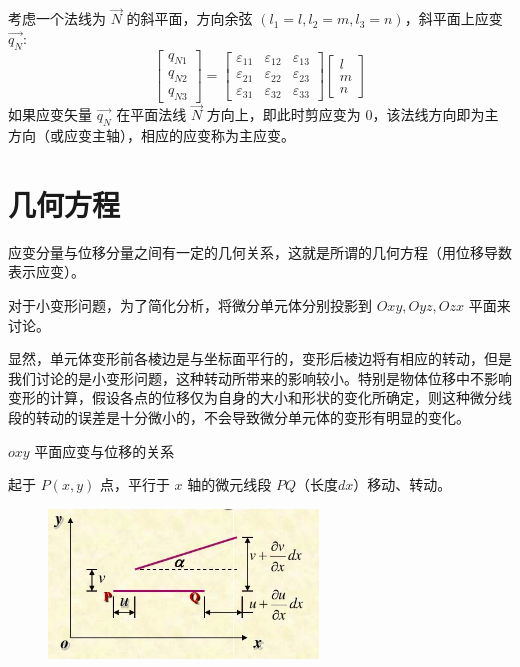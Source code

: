 \documentclass[12pt,a4paper]{article}
\begin{document}
考虑一个法线为 $\overrightarrow{N}$ 的斜平面，方向余弦 $(l_1=l,l_2=m,l_3=n)$，斜平面上应变 $\overrightarrow{q_N}$:
$$
\begin{bmatrix}
q_{N1} \\
q_{N2} \\
q_{N3}
\end{bmatrix}=
\begin{bmatrix}
\varepsilon_{11} & \varepsilon_{12} & \varepsilon_{13} \\
\varepsilon_{21} & \varepsilon_{22} & \varepsilon_{23} \\
\varepsilon_{31} & \varepsilon_{32} & \varepsilon_{33}
\end{bmatrix}
\begin{bmatrix}
l \\
m \\
n
\end{bmatrix}
$$
如果应变矢量 $\overrightarrow{q_N}$ 在平面法线 $\overrightarrow{N}$ 方向上，即此时剪应变为 $0$，该法线方向即为主方向（或应变主轴），相应的应变称为主应变。

\section{几何方程}
应变分量与位移分量之间有一定的几何关系，这就是所谓的几何方程（用位移导数表示应变）。

对于小变形问题，为了简化分析，将微分单元体分别投影到 $Oxy,Oyz,Ozx$ 平面来讨论。

显然，单元体变形前各棱边是与坐标面平行的，变形后棱边将有相应的转动，但是我们讨论的是小变形问题，这种转动所带来的影响较小。特别是物体位移中不影响变形的计算，假设各点的位移仅为自身的大小和形状的变化所确定，则这种微分线段的转动的误差是十分微小的，不会导致微分单元体的变形有明显的变化。

$oxy$ 平面应变与位移的关系

起于 $P(x,y)$ 点，平行于 $x$ 轴的微元线段 $PQ$（长度$dx$）移动、转动。

\begin{figure}[H]
\centering
\includegraphics[scale=0.5]{./figures/13.png}
\caption{}
\end{figure}
\end{document}
